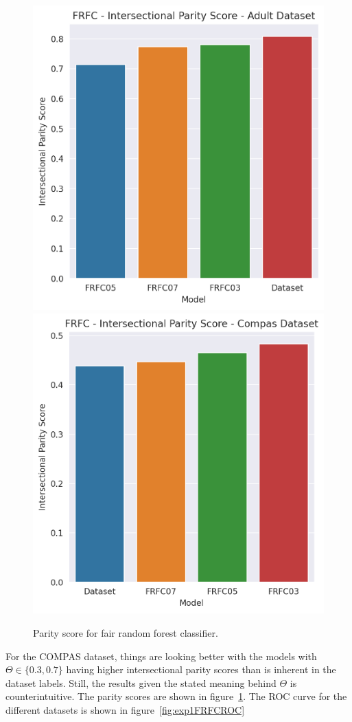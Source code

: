\begin{figure}
    \centering
    \includegraphics[width=0.49\linewidth]{figures/adult_frfc_parity.png}
    \includegraphics[width=0.49\linewidth]{figures/compas_frfc_parity.png}
    \caption{Parity score for fair random forest classifier.}
    \label{fig:exp1FRFCparity}
\end{figure}

For the COMPAS dataset, things are looking better with the models with $\Theta \in \{0.3, 0.7\}$ having higher intersectional parity scores than is inherent in the dataset labels. Still, the results given the stated meaning behind $\Theta$ is counterintuitive. The parity scores are shown in figure~\ref{fig:exp1FRFCparity}. The ROC curve for the different datasets is shown in figure~\ref{fig:exp1FRFCROC}

